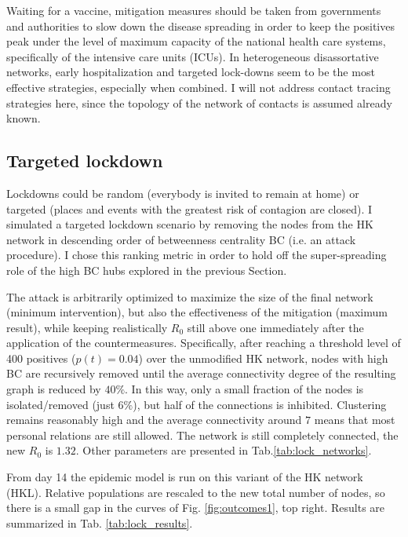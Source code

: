 \documentclass[DIV=12, BCOR=0pt]{scrartcl}  %
\begin{document}
	Waiting for a vaccine, mitigation measures should be taken from governments and authorities to slow down the disease spreading in order to keep the positives peak under the level of maximum capacity of the national health care systems, specifically of the intensive care units (ICUs). 
	In heterogeneous disassortative networks, early hospitalization and targeted lock-downs seem to be the most effective strategies, especially when combined. I will not address contact tracing strategies here, since the topology of the network of contacts is assumed already known. 
	
	\subsection{Targeted lockdown}
	Lockdowns could be random (everybody is invited to remain at home) or targeted (places and events with the greatest risk of contagion are closed). I simulated a targeted lockdown scenario by removing the nodes from the HK network in descending order of betweenness centrality BC (i.e. an attack procedure). I chose this ranking metric in order to hold off the super-spreading role of the high BC hubs explored in the previous Section.
	
	The attack is arbitrarily optimized to maximize the size of the final network (minimum intervention), but also the effectiveness of the mitigation (maximum result), while keeping realistically $R_0$ still above one immediately after the application of the countermeasures.
	Specifically, after reaching a threshold level of 400 positives ($p(t) = 0.04$) over the unmodified HK network, nodes with high BC are recursively removed until the average connectivity degree of the resulting graph is reduced by $ 40 \%$. 
	In this way, only a small fraction of the nodes is isolated/removed (just $6 \%$), but half of the connections is inhibited. Clustering remains reasonably high and the average connectivity around $7$ means that most personal relations are still allowed. The network is still completely connected, the new $R_0$ is $1.32$. Other parameters are presented in Tab.\ref{tab:lock_networks}. 
	
	From day 14 the epidemic model is run on this variant of the HK network (HKL). Relative populations are rescaled to the new total number of nodes, so there is a small gap in the curves of Fig. \ref{fig:outcomes1}, top right.
	Results are summarized in Tab. \ref{tab:lock_results}.
	
\end{document}
